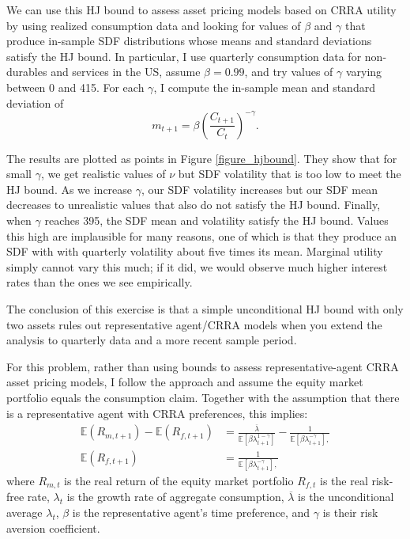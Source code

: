\documentclass[12pt]{article}
\newcommand{\E}{\mathbb{E}}
\begin{document}
We can use this HJ bound to assess asset pricing models based on CRRA utility by using realized consumption data and looking for values of $\beta$ and $\gamma$ that produce in-sample SDF distributions whose means and standard deviations satisfy the HJ bound. In particular, I use quarterly consumption data for non-durables and services in the US, assume $\beta = 0.99$, and try values of $\gamma$ varying between 0 and 415. For each $\gamma$, I compute the in-sample mean and standard deviation of
$$m_{t+1} = \beta \left( \frac{C_{t+1}}{C_t} \right)^{-\gamma}.$$

The results are plotted as points in Figure \ref{figure_hjbound}. They show that for small $\gamma$, we get realistic values of $\nu$ but SDF volatility that is too low to meet the HJ bound. As we increase $\gamma$, our SDF volatility increases but our SDF mean decreases to unrealistic values that also do not satisfy the HJ bound. Finally, when $\gamma$ reaches 395, the SDF mean and volatility satisfy the HJ bound. Values this high are implausible for many reasons, one of which is that they produce an SDF with with quarterly volatility about five times its mean. Marginal utility simply cannot vary this much; if it did, we would observe much higher interest rates than the ones we see empirically.

The conclusion of this exercise is that a simple unconditional HJ bound with only two assets rules out representative agent/CRRA models when you extend the \cite{hansen1991implications} analysis to quarterly data and a more recent sample period.

\clearpage


For this problem, rather than using bounds to assess representative-agent CRRA asset pricing models, I follow the \cite{mehra1985equity} approach and assume the equity market portfolio equals the consumption claim. Together with the assumption that there is a representative agent with CRRA preferences, this implies:
\begin{align*}
\E ( R_{m,t+1} ) - \E ( R_{f,t+1} ) &= \frac{\overline{\lambda}}{\E \left[ \beta \lambda_{t+1}^{1-\gamma} \right]} - \frac{1}{\E \left[ \beta \lambda_{t+1}^{-\gamma} \right], } \\
\E ( R_{f,t+1} ) &=  \frac{1}{\E \left[ \beta \lambda_{t+1}^{-\gamma} \right], }
\end{align*}
where $R_{m,t}$ is the real return of the equity market portfolio $R_{f,t}$ is the real risk-free rate, $\lambda_t$ is the growth rate of aggregate consumption, $\overline{\lambda}$ is the unconditional average $\lambda_t$, $\beta$ is the representative agent's time preference, and $\gamma$ is their risk aversion coefficient.
\end{document}
